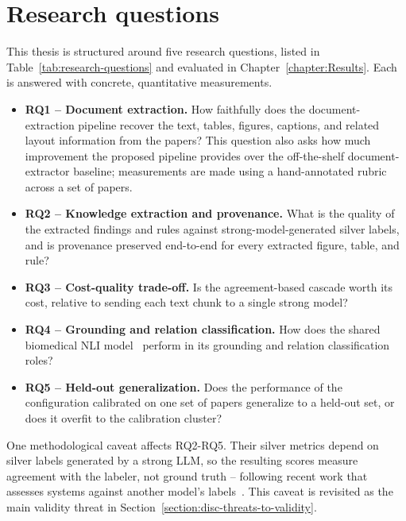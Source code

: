 \section{Research questions}\label{section:intro-research-questions}

This thesis is structured around five research questions, listed in Table~\ref{tab:research-questions} and evaluated in Chapter~\ref{chapter:Results}. Each is answered with concrete, quantitative measurements. 

\begin{itemize}[label={},leftmargin=1.5em]

    \item \textbf{RQ1 -- Document extraction.} How faithfully does the document-extraction pipeline recover the text, tables, figures, captions, and related layout information from the papers? This question also asks how much improvement the proposed pipeline provides over the off-the-shelf document-extractor baseline; measurements are made using a hand-annotated rubric across a set of papers.
    
    \item \textbf{RQ2 -- Knowledge extraction and provenance.} What is the quality of the extracted findings and rules against strong-model-generated silver labels, and is provenance preserved end-to-end for every extracted figure, table, and rule?
    
    \item \textbf{RQ3 -- Cost-quality trade-off.} Is the agreement-based cascade worth its cost, relative to sending each text chunk to a single strong model?
    
    \item \textbf{RQ4 -- Grounding and relation classification.} How does the shared biomedical NLI model~\parencite{deka2023pubmedbertextended} perform in its grounding and relation classification roles?
    
    \item \textbf{RQ5 -- Held-out generalization.} Does the performance of the configuration calibrated on one set of papers generalize to a held-out set, or does it overfit to the calibration cluster?

\end{itemize}

One methodological caveat affects RQ2-RQ5. Their silver metrics depend on silver labels generated by a strong LLM, so the resulting scores measure agreement with the labeler, not ground truth -- following recent work that assesses systems against another model's labels~\parencite{zheng2023judgingllmasajudgemtbench}. This caveat is revisited as the main validity threat in Section~\ref{section:disc-threats-to-validity}.